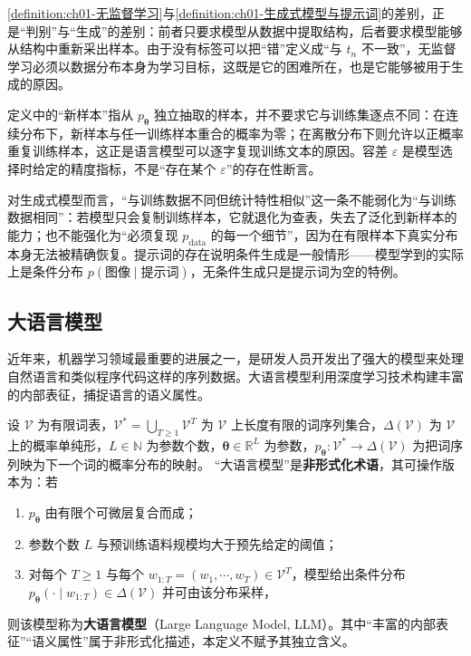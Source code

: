\documentclass[../../main.tex]{subfiles}
\begin{document}
\begin{remark}
\cref{definition:ch01-无监督学习}与\cref{definition:ch01-生成式模型与提示词}的差别，正是“判别”与“生成”的差别：前者只要求模型从数据中提取结构，后者要求模型能够从结构中重新采出样本。由于没有标签可以把“错”定义成“与 $t_n$ 不一致”，无监督学习必须以数据分布本身为学习目标，这既是它的困难所在，也是它能够被用于生成的原因。

定义中的“新样本”指从 $p_{\boldsymbol{\theta}}$ 独立抽取的样本，并不要求它与训练集逐点不同：在连续分布下，新样本与任一训练样本重合的概率为零；在离散分布下则允许以正概率重复训练样本，这正是语言模型可以逐字复现训练文本的原因。容差 $\varepsilon$ 是模型选择时给定的精度指标，不是“存在某个 $\varepsilon$”的存在性断言。

对生成式模型而言，“与训练数据不同但统计特性相似”这一条不能弱化为“与训练数据相同”：若模型只会复制训练样本，它就退化为查表，失去了泛化到新样本的能力；也不能强化为“必须复现 $p_{\mathrm{data}}$ 的每一个细节”，因为在有限样本下真实分布本身无法被精确恢复。提示词的存在说明条件生成是一般情形——模型学到的实际上是条件分布 $p(\text{图像}\mid\text{提示词})$，无条件生成只是提示词为空的特例。
\end{remark}

\subsection{大语言模型}\label{subsection:ch01-大语言模型}

近年来，机器学习领域最重要的进展之一，是研发人员开发出了强大的模型来处理自然语言和类似程序代码这样的序列数据。大语言模型利用深度学习技术构建丰富的内部表征，捕捉语言的语义属性。

\begin{definition}[大语言模型]\label{definition:ch01-大语言模型}
设 $\mathcal{V}$ 为有限词表，$\mathcal{V}^{*}=\bigcup_{T\geqslant1}\mathcal{V}^{T}$ 为 $\mathcal{V}$ 上长度有限的词序列集合，$\Delta(\mathcal{V})$ 为 $\mathcal{V}$ 上的概率单纯形，$L\in\mathbb{N}$ 为参数个数，$\boldsymbol{\theta}\in\mathbb{R}^{L}$ 为参数，$p_{\boldsymbol{\theta}}:\mathcal{V}^{*}\to\Delta(\mathcal{V})$ 为把词序列映为下一个词的概率分布的映射。
“大语言模型”是\textbf{非形式化术语}，其可操作版本为：若
\begin{enumerate}
  \item $p_{\boldsymbol{\theta}}$ 由有限个可微层复合而成；
  \item 参数个数 $L$ 与预训练语料规模均大于预先给定的阈值；
  \item 对每个 $T\geqslant1$ 与每个 $w_{1:T}=(w_{1},\cdots,w_{T})\in\mathcal{V}^{T}$，模型给出条件分布 $p_{\boldsymbol{\theta}}(\cdot\mid w_{1:T})\in\Delta(\mathcal{V})$ 并可由该分布采样，
\end{enumerate}
则该模型称为\textbf{大语言模型}（Large Language Model, LLM）。其中“丰富的内部表征”“语义属性”属于非形式化描述，本定义不赋予其独立含义。
\end{definition}
\end{document}
